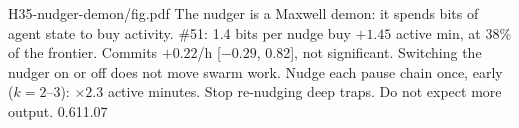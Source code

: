 {H35-nudger-demon/fig.pdf}
{The nudger is a Maxwell demon: it spends bits of agent state to buy activity.}
{\#51: 1.4 bits per nudge buy $+1.45$ active min, at 38\% of the frontier. Commits $+0.22$/h [$-0.29$, 0.82], not significant. Switching the nudger on or off does not move swarm work.}
{Nudge each pause chain once, early ($k=2$--3): $\times2.3$ active minutes. Stop re-nudging deep traps. Do not expect more output.}
{0.61}{1.07}
